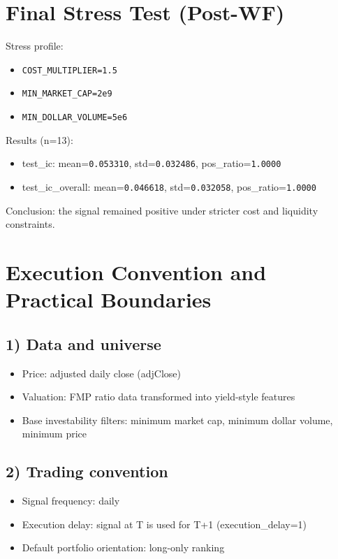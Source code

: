 \documentclass[12pt,a4paper]{article}
\begin{document}
\section{Final Stress Test (Post-WF)}
Stress profile:
\begin{itemize}
  \item \texttt{COST\_MULTIPLIER=1.5}
  \item \texttt{MIN\_MARKET\_CAP=2e9}
  \item \texttt{MIN\_DOLLAR\_VOLUME=5e6}
\end{itemize}

Results (n=13):
\begin{itemize}
  \item test\_ic: mean=\texttt{0.053310}, std=\texttt{0.032486}, pos\_ratio=\texttt{1.0000}
  \item test\_ic\_overall: mean=\texttt{0.046618}, std=\texttt{0.032058}, pos\_ratio=\texttt{1.0000}
\end{itemize}

Conclusion: the signal remained positive under stricter cost and liquidity constraints.

\section{Execution Convention and Practical Boundaries}
\subsection*{1) Data and universe}
\begin{itemize}
  \item Price: adjusted daily close (adjClose)
  \item Valuation: FMP ratio data transformed into yield-style features
  \item Base investability filters: minimum market cap, minimum dollar volume, minimum price
\end{itemize}

\subsection*{2) Trading convention}
\begin{itemize}
  \item Signal frequency: daily
  \item Execution delay: signal at T is used for T+1 (execution\_delay=1)
  \item Default portfolio orientation: long-only ranking
\end{itemize}
\end{document}
